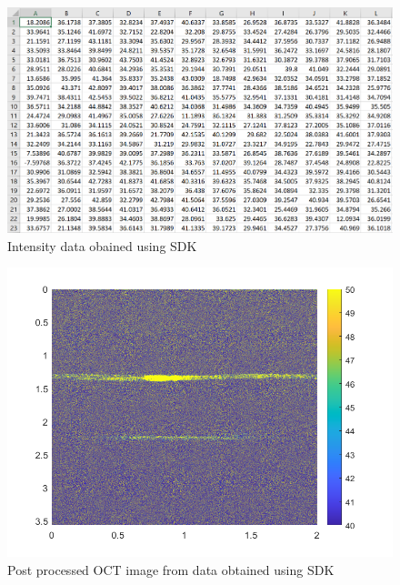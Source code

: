 \begin{figure}[H]\label{fig4.7}
\centering \includegraphics[scale=0.35]{Images/test_oct_xls.PNG}
\caption{Intensity data obained using SDK}
\end{figure}

\begin{figure}[H]\label{fig4.8}
\centering \includegraphics[scale=0.35]{Images/OCT_Image_SDK.PNG}
\caption{Post processed OCT image from data obtained using SDK}
\end{figure}


